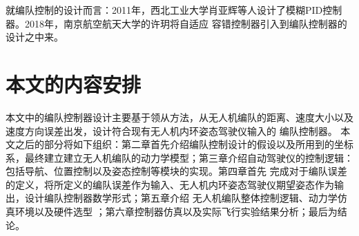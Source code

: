 就编队控制的设计而言：2011年，西北工业大学肖亚辉等人设计了模糊PID控制器。\cite{XiaoYaHui2011}2018年，南京航空航天大学的许玥将自适应
容错控制器引入到编队控制器的设计之中来。\cite{XuYue}
\section{本文的内容安排}
本文中的编队控制器设计主要基于领从方法，从无人机编队的距离、速度大小以及速度方向误差出发，设计符合现有无人机内环姿态驾驶仪输入的
编队控制器。
本文之后的部分将如下组织：第二章首先介绍编队控制设计的假设以及所用到的坐标系，最终建立建立无人机编队的动力学模型；第三章介绍自动驾驶仪的控制逻辑：包括导航、位置控制以及姿态控制等模块的实现。第四章首先
完成对于编队误差的定义，将所定义的编队误差作为输入、无人机内环姿态驾驶仪期望姿态作为输出，设计编队控制器数学形式；第五章介绍
无人机编队整体控制逻辑、动力学仿真环境以及硬件选型 ；第六章控制器仿真以及实际飞行实验结果分析；最后为结论。
